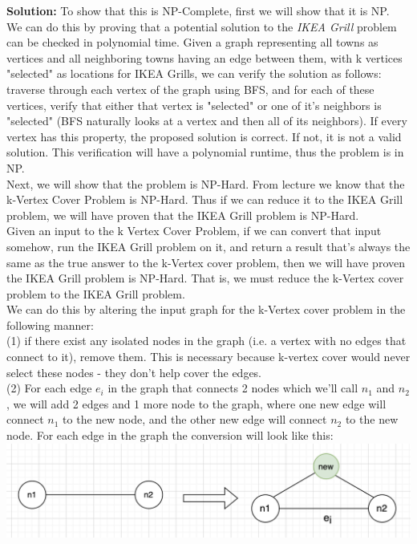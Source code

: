 \documentclass[10pt]{article}
\newcommand{\solution}[1]{\color{blue}\hfill\break\noindent\textbf{Solution:} #1\color{black}}
\begin{document}
\solution{
    To show that this is NP-Complete, first we will show that it is NP. \\
    We can do this by proving that a potential solution to the \emph{IKEA Grill} problem can be checked in polynomial time. Given a graph representing all towns as vertices and all neighboring towns having an edge between them, with k vertices "selected" as locations for IKEA Grills, we can verify the solution as follows: traverse through each vertex of the graph using BFS, and for each of these vertices, verify that either that vertex is "selected" or one of it's neighbors is "selected" (BFS naturally looks at a vertex and then all of its neighbors). If every vertex has this property, the proposed solution is correct. If not, it is not a valid solution. This verification will have a polynomial runtime, thus the problem is in NP. \\
    Next, we will show that the problem is NP-Hard. From lecture we know that the k-Vertex Cover Problem is NP-Hard. Thus if we can reduce it to the IKEA Grill problem, we will have proven that the IKEA Grill problem is NP-Hard. \\ 
    Given an input to the k Vertex Cover Problem, if we can convert that input somehow, run the IKEA Grill problem on it, and return a result that's always the same as the true answer to the k-Vertex cover problem, then we will have proven the IKEA Grill problem is NP-Hard. That is, we must reduce the k-Vertex cover problem to the IKEA Grill problem. \\
    We can do this by altering the input graph for the k-Vertex cover problem in the following manner: \\
    (1) if there exist any isolated nodes in the graph (i.e. a vertex with no edges that connect to it), remove them. This is necessary because k-vertex cover would never select these nodes - they don't help cover the edges. \\
    (2) For each edge $e_i$ in the graph that connects 2 nodes which we'll call $n_1$ and $n_2$, we will add 2 edges and 1 more node to the graph, where one new edge will connect $n_1$ to the new node, and the other new edge will connect $n_2$ to the new node. For each edge in the graph the conversion will look like this: \\
    \includegraphics[scale=.8]{ikea.png}
}
\end{document}
